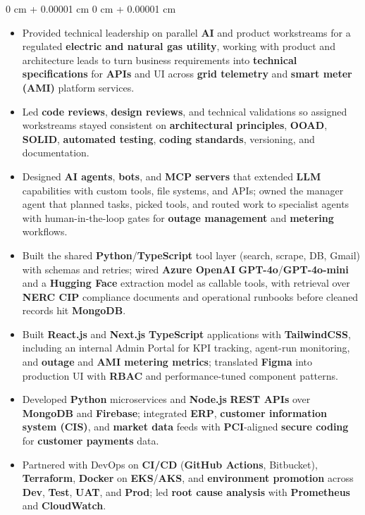 \documentclass[10pt, letterpaper]{article}
\newenvironment{highlights}{
    \begin{itemize}[
        topsep=0.04 cm,
        parsep=0.04 cm,
        partopsep=0pt,
        itemsep=0pt,
        leftmargin=0 cm + 10pt
    ]
}{
    \end{itemize}
} %
\newenvironment{onecolentry}{
    \begin{adjustwidth}{
        0 cm + 0.00001 cm
    }{
        0 cm + 0.00001 cm
    }
}{
    \end{adjustwidth}
} %
\begin{document}
\begin{onecolentry}
\begin{highlights}
	\item Provided technical leadership on parallel \textbf{AI} and product workstreams for a regulated \textbf{electric and natural gas utility}, working with product and architecture leads to turn business requirements into \textbf{technical specifications} for \textbf{APIs} and UI across \textbf{grid telemetry} and \textbf{smart meter (AMI)} platform services.
	\item Led \textbf{code reviews}, \textbf{design reviews}, and technical validations so assigned workstreams stayed consistent on \textbf{architectural principles}, \textbf{OOAD}, \textbf{SOLID}, \textbf{automated testing}, \textbf{coding standards}, versioning, and documentation.
	\item Designed \textbf{AI agents}, \textbf{bots}, and \textbf{MCP servers} that extended \textbf{LLM} capabilities with custom tools, file systems, and APIs; owned the manager agent that planned tasks, picked tools, and routed work to specialist agents with human-in-the-loop gates for \textbf{outage management} and \textbf{metering} workflows.
	\item Built the shared \textbf{Python}/\textbf{TypeScript} tool layer (search, scrape, DB, Gmail) with schemas and retries; wired \textbf{Azure OpenAI} \textbf{GPT-4o}/\textbf{GPT-4o-mini} and a \textbf{Hugging Face} extraction model as callable tools, with retrieval over \textbf{NERC CIP} compliance documents and operational runbooks before cleaned records hit \textbf{MongoDB}.
	\item Built \textbf{React.js} and \textbf{Next.js} \textbf{TypeScript} applications with \textbf{TailwindCSS}, including an internal Admin Portal for KPI tracking, agent-run monitoring, and \textbf{outage} and \textbf{AMI metering metrics}; translated \textbf{Figma} into production UI with \textbf{RBAC} and performance-tuned component patterns.
	\item Developed \textbf{Python} microservices and \textbf{Node.js} \textbf{REST APIs} over \textbf{MongoDB} and \textbf{Firebase}; integrated \textbf{ERP}, \textbf{customer information system (CIS)}, and \textbf{market data} feeds with \textbf{PCI}-aligned \textbf{secure coding} for \textbf{customer payments} data.
	\item Partnered with DevOps on \textbf{CI/CD} (\textbf{GitHub Actions}, Bitbucket), \textbf{Terraform}, \textbf{Docker} on \textbf{EKS}/\textbf{AKS}, and \textbf{environment promotion} across \textbf{Dev}, \textbf{Test}, \textbf{UAT}, and \textbf{Prod}; led \textbf{root cause analysis} with \textbf{Prometheus} and \textbf{CloudWatch}.
\end{highlights}
\end{onecolentry}
\end{document}
